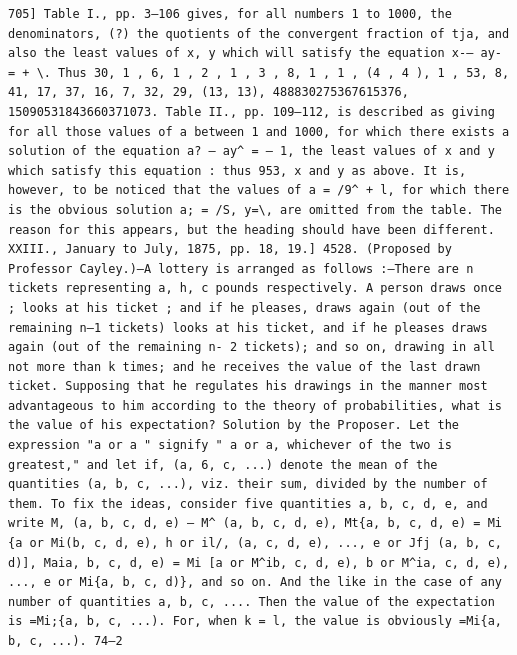 \documentclass[11pt,a4paper]{book}
\begin{document}
\newpage
\setcounter{page}{587}
\begin{verbatim}
705] Table I., pp. 3—106 gives, for all numbers 1 to 1000, the denominators, (?) the quotients of the convergent fraction of tja, and also the least values of x, y which will satisfy the equation x-— ay- = + \. Thus 30, 1 , 6, 1 , 2 , 1 , 3 , 8, 1 , 1 , (4 , 4 ), 1 , 53, 8, 41, 17, 37, 16, 7, 32, 29, (13, 13), 488830275367615376, 15090531843660371073. Table II., pp. 109—112, is described as giving for all those values of a between 1 and 1000, for which there exists a solution of the equation a? — ay^ = — 1, the least values of x and y which satisfy this equation : thus 953, x and y as above. It is, however, to be noticed that the values of a = /9^ + l, for which there is the obvious solution a; = /S, y=\, are omitted from the table. The reason for this appears, but the heading should have been different. XXIII., January to July, 1875, pp. 18, 19.] 4528. (Proposed by Professor Cayley.)—A lottery is arranged as follows :—There are n tickets representing a, h, c pounds respectively. A person draws once ; looks at his ticket ; and if he pleases, draws again (out of the remaining n—1 tickets) looks at his ticket, and if he pleases draws again (out of the remaining n- 2 tickets); and so on, drawing in all not more than k times; and he receives the value of the last drawn ticket. Supposing that he regulates his drawings in the manner most advantageous to him according to the theory of probabilities, what is the value of his expectation? Solution by the Proposer. Let the expression "a or a " signify " a or a, whichever of the two is greatest," and let if, (a, 6, c, ...) denote the mean of the quantities (a, b, c, ...), viz. their sum, divided by the number of them. To fix the ideas, consider five quantities a, b, c, d, e, and write M, (a, b, c, d, e) — M^ (a, b, c, d, e), Mt{a, b, c, d, e) = Mi {a or Mi(b, c, d, e), h or il/, (a, c, d, e), ..., e or Jfj (a, b, c, d)], Maia, b, c, d, e) = Mi [a or M^ib, c, d, e), b or M^ia, c, d, e), ..., e or Mi{a, b, c, d)}, and so on. And the like in the case of any number of quantities a, b, c, .... Then the value of the expectation is =Mi;{a, b, c, ...). For, when k = l, the value is obviously =Mi{a, b, c, ...). 74—2 
\end{verbatim}
\end{document}
